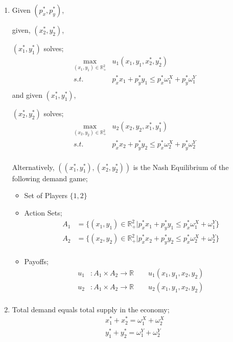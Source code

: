 \documentclass[12pt,a4paper]{article}
\begin{document}
  \begin{enumerate}
   \item Given \(\left( p_{x}^*,p_{y}^* \right) \),
     
  given, \(\left( x_{2}^*,y_{2}^*  \right) \),

     \(\left( x_{1}^*,y_{1}^*  \right) \) solves;
  \begin{align*}
      \max_{(x_{1},y_{1}) \in \mathbb{R}^2_{+}} & u_{1}(x_{1},y_{1},x_{2}^*,y_{2}^*) \\
      s.t. & p_{x}^*x_{1}+p_{y}^*y_{1} \leq p_{x}^* \omega _{1}^X + p_{y}^*\omega_{1}^Y\\
  \end{align*}     
  and given \(\left( x_{1}^*,y_{1}^*  \right) \),

    \(\left( x_{2}^*,y_{2}^*  \right) \) solves;
  \begin{align*}
    \max_{(x_{2},y_{2}) \in \mathbb{R}^2_{+}} & u_{2}(x_{2},y_{2},x_{1}^*,y_{1}^*) \\
    s.t. & p_{x}^*x_{2}+p_{y}^*y_{2} \leq p_{x}^* \omega _{2}^X + p_{y}^*\omega_{2}^Y\\
\end{align*}       

Alternatively, 
\(\left( (x_{1}^*,y_{1}^*),(x_{2}^*,y_{2}^*) \right) \)  is the Nash Equilibrium of the following demand game;
\begin{itemize}
    \item Set of Players $\{1,2\}$
    \item Action Sets; 
    \begin{align*}
    A_{1}&=\{(x_{1},y_{1}) \in \mathbb{R}^{2}_{+} | p_{x}^*x_{1} + p_{y}^*y_{1} \leq p_{x}^*\omega_{1}^X + \omega_{1}^Y\}\\
    A_{2}&=\{(x_{2},y_{2}) \in \mathbb{R}^{2}_{+} | p_{x}^*x_{2} + p_{y}^*y_{2} \leq p_{x}^*\omega_{2}^X + \omega_{2}^Y\} \\
    \end{align*}
    \item Payoffs;
    \begin{align*}
        u_{1}&: A_{1} \times A_{2} \rightarrow \mathbb{R} \qquad u_{1}(x_{1},y_{1},x_{2},y_{2})\\
        u_{2}&: A_{1} \times A_{2} \rightarrow \mathbb{R} \qquad u_{2}(x_{1},y_{1},x_{2},y_{2})\\
    \end{align*}
    \end{itemize}
    \item Total demand equals total supply in the economy;
    \begin{equation*}
        \begin{split}
            x_{1}^*+x_{2}^*=\omega_{1}^X+\omega_{2}^X\\
            y_{1}^*+y_{2}^*=\omega_{1}^Y+\omega_{2}^Y\\
        \end{split}
    \end{equation*}
  \end{enumerate}
\end{document}
